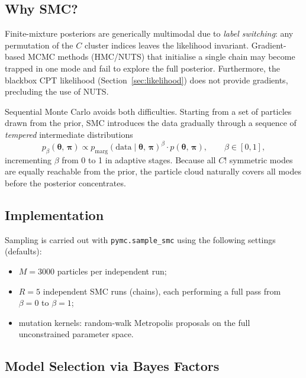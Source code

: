 \documentclass[12pt, a4paper]{article}
\newcommand{\btheta}{\bm{\theta}}
\newcommand{\bpi}{\bm{\pi}}
\begin{document}
\subsection{Why SMC?}

Finite-mixture posteriors are generically multimodal due to \emph{label
switching}: any permutation of the $C$ cluster indices leaves the likelihood
invariant.  Gradient-based MCMC methods (HMC/NUTS) that initialise a single
chain may become trapped in one mode and fail to explore the full posterior.
Furthermore, the blackbox CPT likelihood (Section~\ref{sec:likelihood}) does
not provide gradients, precluding the use of NUTS.

Sequential Monte Carlo \citep[SMC;][]{DelMoral2006} avoids both difficulties.
Starting from a set of particles drawn from the prior, SMC introduces the data
gradually through a sequence of \emph{tempered} intermediate distributions
\begin{equation}
  p_\beta(\btheta,\, \bpi)
  \propto p_{\mathrm{marg}}(\mathrm{data} \mid \btheta,\, \bpi)^{\beta}
          \cdot p(\btheta,\, \bpi),
  \qquad \beta \in [0, 1],
  \label{eq:tempered}
\end{equation}
incrementing $\beta$ from 0 to 1 in adaptive stages.  Because all $C!$
symmetric modes are equally reachable from the prior, the particle cloud
naturally covers all modes before the posterior concentrates.

\subsection{Implementation}

Sampling is carried out with \texttt{pymc.sample\_smc} using the following
settings (defaults):
\begin{itemize}
  \item $M = 3000$ particles per independent run;
  \item $R = 5$ independent SMC runs (chains), each performing a full pass
        from $\beta=0$ to $\beta=1$;
  \item mutation kernels: random-walk Metropolis proposals on the full
        unconstrained parameter space.
\end{itemize}

\subsection{Model Selection via Bayes Factors}
\label{sec:model_selection}
\end{document}
